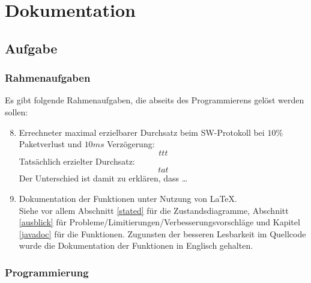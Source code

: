 \maketitle
\newpage
\tableofcontents
\newpage

\chapter{Dokumentation}

\section{Aufgabe}

\subsection{Rahmenaufgaben}

Es gibt folgende Rahmenaufgaben, die abseits des Programmierens gelöst werden sollen:
\begin{enumerate}
\setcounter{enumi}{7}
\item Errechneter maximal erzielbarer Durchsatz beim SW-Protokoll bei $10\%$ Paketverlust und $10\unit{ms}$ Verzögerung:
$$ttt$$
Tatsächlich erzielter Durchsatz:
$$tat$$
Der Unterschied ist damit zu erklären, dass …
\item Dokumentation der Funktionen unter Nutzung von \LaTeX{}.\\
Siehe vor allem Abschnitt \ref{stated} für die Zustandsdiagramme, Abschnitt \ref{ausblick} für Probleme/Limitierungen/Verbesserungsvorschläge  und Kapitel \ref{javadoc} für die Funktionen. Zugunsten der besseren Lesbarkeit im Quellcode wurde die Dokumentation der Funktionen in Englisch gehalten.
\end{enumerate}

\subsection{Programmierung}

